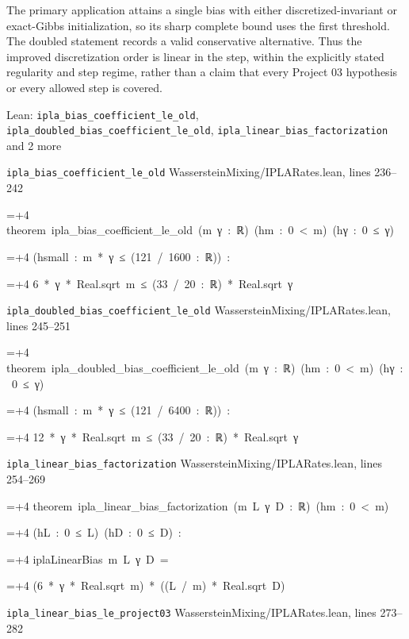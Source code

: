 \documentclass[11pt,a4paper]{article}
\newlength{\leancharwidth}
\newenvironment{leancode}{\par\smallskip\begingroup\ttfamily\footnotesize\raggedright
  \settowidth{\leancharwidth}{M}\setlength{\parskip}{0pt}\setlength{\parindent}{0pt}
  \frenchspacing}{\par\endgroup\smallskip}
\newcommand{\leanline}[2]{\hangindent=\dimexpr#1\leancharwidth+4\leancharwidth\relax
  \hangafter=1\noindent\hspace*{#1\leancharwidth}#2\par}
\newcommand{\leansource}[1]{\par{\footnotesize\color{leanmuted}#1}\par}
\begin{document}
The primary application attains a single bias with either discretized-invariant or exact-Gibbs initialization, so its sharp complete bound uses the first threshold. The doubled statement records a valid conservative alternative. Thus the improved discretization order is linear in the step, within the explicitly stated regularity and step regime, rather than a claim that every Project 03 hypothesis or every allowed step is covered.

\begin{leanbox}{Lean: \texttt{ipla\_\allowbreak{}bias\_\allowbreak{}coefficient\_\allowbreak{}le\_\allowbreak{}old}, \texttt{ipla\_\allowbreak{}doubled\_\allowbreak{}bias\_\allowbreak{}coefficient\_\allowbreak{}le\_\allowbreak{}old}, \texttt{ipla\_\allowbreak{}linear\_\allowbreak{}bias\_\allowbreak{}factorization} and 2 more}
\leansource{\texttt{ipla\_\allowbreak{}bias\_\allowbreak{}coefficient\_\allowbreak{}le\_\allowbreak{}old} \quad WassersteinMixing/\allowbreak{}IPLARates.lean, lines 236–242}
\begin{leancode}
\leanline{0}{theorem\ ipla\_bias\_coefficient\_le\_old\ (m\ γ\ :\ ℝ)\ (hm\ :\ 0\ <\ m)\ (hγ\ :\ 0\ ≤\ γ)}
\leanline{4}{(hsmall\ :\ m\ *\ γ\ ≤\ (121\ /\ 1600\ :\ ℝ))\ :}
\leanline{4}{6\ *\ γ\ *\ Real.sqrt\ m\ ≤\ (33\ /\ 20\ :\ ℝ)\ *\ Real.sqrt\ γ}
\end{leancode}
\leansource{\texttt{ipla\_\allowbreak{}doubled\_\allowbreak{}bias\_\allowbreak{}coefficient\_\allowbreak{}le\_\allowbreak{}old} \quad WassersteinMixing/\allowbreak{}IPLARates.lean, lines 245–251}
\begin{leancode}
\leanline{0}{theorem\ ipla\_doubled\_bias\_coefficient\_le\_old\ (m\ γ\ :\ ℝ)\ (hm\ :\ 0\ <\ m)\ (hγ\ :\ 0\ ≤\ γ)}
\leanline{4}{(hsmall\ :\ m\ *\ γ\ ≤\ (121\ /\ 6400\ :\ ℝ))\ :}
\leanline{4}{12\ *\ γ\ *\ Real.sqrt\ m\ ≤\ (33\ /\ 20\ :\ ℝ)\ *\ Real.sqrt\ γ}
\end{leancode}
\leansource{\texttt{ipla\_\allowbreak{}linear\_\allowbreak{}bias\_\allowbreak{}factorization} \quad WassersteinMixing/\allowbreak{}IPLARates.lean, lines 254–269}
\begin{leancode}
\leanline{0}{theorem\ ipla\_linear\_bias\_factorization\ (m\ L\ γ\ D\ :\ ℝ)\ (hm\ :\ 0\ <\ m)}
\leanline{4}{(hL\ :\ 0\ ≤\ L)\ (hD\ :\ 0\ ≤\ D)\ :}
\leanline{4}{iplaLinearBias\ m\ L\ γ\ D\ =}
\leanline{6}{(6\ *\ γ\ *\ Real.sqrt\ m)\ *\ ((L\ /\ m)\ *\ Real.sqrt\ D)}
\end{leancode}
\leansource{\texttt{ipla\_\allowbreak{}linear\_\allowbreak{}bias\_\allowbreak{}le\_\allowbreak{}project03} \quad WassersteinMixing/\allowbreak{}IPLARates.lean, lines 273–282}

\end{leanbox}
\end{document}
